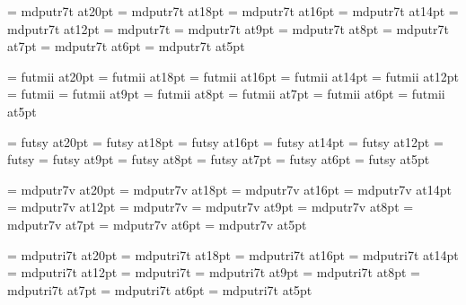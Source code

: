 
\font\twentyrm=     mdputr7t at20pt
\font\eighteenrm=   mdputr7t at18pt
\font\sixteenrm=    mdputr7t at16pt
\font\fourteenrm=   mdputr7t at14pt
\font\twelverm=     mdputr7t at12pt
\font\tenrm=        mdputr7t %
\font\ninerm=       mdputr7t at9pt
\font\eightrm=      mdputr7t at8pt
\font\sevenrm=      mdputr7t at7pt
\font\sixrm=        mdputr7t at6pt
\font\fiverm=       mdputr7t at5pt

\font\twentyi=      futmii at20pt
\font\eighteeni=    futmii at18pt
\font\sixteeni=     futmii at16pt
\font\fourteeni=    futmii at14pt
\font\twelvei=      futmii at12pt
\font\teni=         futmii %
\font\ninei=        futmii at9pt
\font\eighti=       futmii at8pt
\font\seveni=       futmii at7pt
\font\sixi=         futmii at6pt
\font\fivei=        futmii at5pt

\font\twentysy=     futsy at20pt
\font\eighteensy=   futsy at18pt
\font\sixteensy=    futsy at16pt
\font\fourteensy=   futsy at14pt
\font\twelvesy=     futsy at12pt
\font\tensy=        futsy %
\font\ninesy=       futsy at9pt
\font\eightsy=      futsy at8pt
\font\sevensy=      futsy at7pt
\font\sixsy=        futsy at6pt
\font\fivesy=       futsy at5pt

\font\twentyex=     mdputr7v at20pt
\font\eighteenex=   mdputr7v at18pt
\font\sixteenex=    mdputr7v at16pt
\font\fourteenex=   mdputr7v at14pt
\font\twelveex=     mdputr7v at12pt
\font\tenex=        mdputr7v
\font\nineex=       mdputr7v at9pt
\font\eightex=      mdputr7v at8pt
\font\sevenex=      mdputr7v at7pt
\font\sixex=        mdputr7v at6pt
\font\fiveex=       mdputr7v at5pt

\font\twentyit=     mdputri7t at20pt
\font\eighteenit=   mdputri7t at18pt
\font\sixteenit=    mdputri7t at16pt
\font\fourteenit=   mdputri7t at14pt
\font\twelveit=     mdputri7t at12pt
\font\tenit=        mdputri7t
\font\nineit=       mdputri7t at9pt
\font\eightit=      mdputri7t at8pt
\font\sevenit=      mdputri7t at7pt
\font\sixit=        mdputri7t at6pt
\font\fiveit=       mdputri7t at5pt

